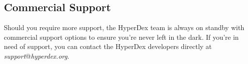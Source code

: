 \subsection{Commercial Support}
\label{sec:introduction:support:commercial}

Should you require more support, the HyperDex team is always on standby with
commercial support options to ensure you're never left in the dark.  If you're
in need of support, you can contact the HyperDex developers directly at {\em
support}@{\em hyperdex.org}.
